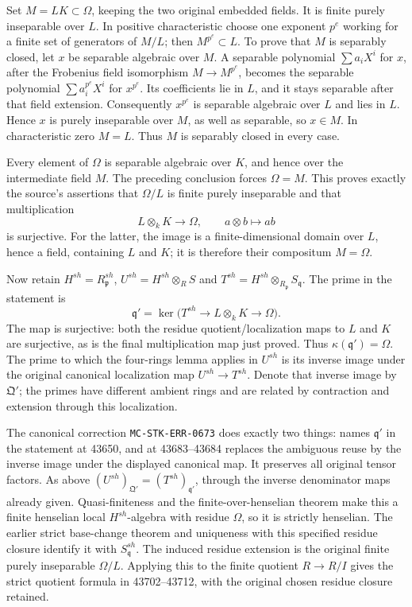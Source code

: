 Set \(M=LK\subset\Omega\), keeping the two original embedded fields. It is finite purely inseparable over \(L\). In positive characteristic choose one exponent \(p^e\) working for a finite set of generators of \(M/L\); then \(M^{p^e}\subset L\). To prove that \(M\) is separably closed, let \(x\) be separable algebraic over \(M\). A separable polynomial \(\sum a_iX^i\) for \(x\), after the Frobenius field isomorphism \(M\to M^{p^e}\), becomes the separable polynomial \(\sum a_i^{p^e}X^i\) for \(x^{p^e}\). Its coefficients lie in \(L\), and it stays separable after that field extension. Consequently \(x^{p^e}\) is separable algebraic over \(L\) and lies in \(L\). Hence \(x\) is purely inseparable over \(M\), as well as separable, so \(x\in M\). In characteristic zero \(M=L\). Thus \(M\) is separably closed in every case.

Every element of \(\Omega\) is separable algebraic over \(K\), and hence over the intermediate field \(M\). The preceding conclusion forces \(\Omega=M\). This proves exactly the source's assertions that \(\Omega/L\) is finite purely inseparable and that multiplication \[
 L\otimes_k K\longrightarrow\Omega,\qquad a\otimes b\longmapsto ab
\] is surjective. For the latter, the image is a finite-dimensional domain over \(L\), hence a field, containing \(L\) and \(K\); it is therefore their compositum \(M=\Omega\).

Now retain \(H^{sh}=R_{\mathfrak p}^{sh}\), \(U^{sh}=H^{sh}\otimes_R S\) and \(T^{sh}=H^{sh}\otimes_{R_{\mathfrak p}}S_{\mathfrak q}\). The prime in the statement is \[
 \mathfrak q'=\ker\bigl(T^{sh}\longrightarrow L\otimes_k K
                                     \longrightarrow\Omega\bigr).
\] The map is surjective: both the residue quotient/localization maps to \(L\) and \(K\) are surjective, as is the final multiplication map just proved. Thus \(\kappa(\mathfrak q')=\Omega\). The prime to which the four-rings lemma applies in \(U^{sh}\) is its inverse image under the original canonical localization map \(U^{sh}\to T^{sh}\). Denote that inverse image by \(\mathfrak Q'\); the primes have different ambient rings and are related by contraction and extension through this localization.

The canonical correction \texttt{MC-\AlgebraIdentifierBreak{}STK-\AlgebraIdentifierBreak{}ERR-\AlgebraIdentifierBreak{}0673} does exactly two things: names \(\mathfrak q'\) in the statement at 43650, and at 43683--43684 replaces the ambiguous reuse by the inverse image under the displayed canonical map. It preserves all original tensor factors. As above \((U^{sh})_{\mathfrak Q'}=(T^{sh})_{\mathfrak q'}\), through the inverse denominator maps already given. Quasi-finiteness and the finite-over-henselian theorem make this a finite henselian local \(H^{sh}\)-algebra with residue \(\Omega\), so it is strictly henselian. The earlier strict base-change theorem and uniqueness with this specified residue closure identify it with \(S_{\mathfrak q}^{sh}\). The induced residue extension is the original finite purely inseparable \(\Omega/L\). Applying this to the finite quotient \(R\to R/I\) gives the strict quotient formula in 43702--43712, with the original chosen residue closure retained.

